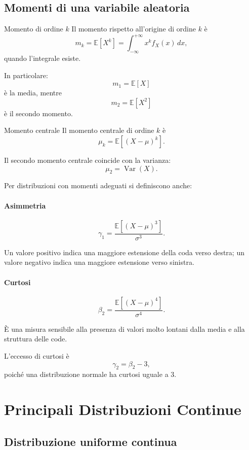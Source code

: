 \subsection{Momenti di una variabile aleatoria}

\begin{definition}{Momento di ordine $k$}
Il momento rispetto all'origine
di ordine $k$ è
\[
\boxed{
m_k=\mathbb{E}[X^k]
=
\int_{-\infty}^{+\infty}
x^k f_X(x)\,dx,
}
\]
quando l'integrale esiste.
\end{definition}

In particolare:
\[
m_1=\mathbb{E}[X]
\]
è la media, mentre
\[
m_2=\mathbb{E}[X^2]
\]
è il secondo momento.

\begin{definition}{Momento centrale}
Il momento centrale di ordine $k$ è
\[
\boxed{
\mu_k=\mathbb{E}[(X-\mu)^k].
}
\]
\end{definition}

Il secondo momento centrale coincide
con la varianza:
\[
\mu_2=\operatorname{Var}(X).
\]

Per distribuzioni con momenti adeguati
si definiscono anche:

\paragraph{Asimmetria}
\[
\gamma_1
=
\frac{\mathbb{E}[(X-\mu)^3]}{\sigma^3}.
\]

Un valore positivo indica
una maggiore estensione
della coda verso destra;
un valore negativo
indica una maggiore estensione
verso sinistra.

\paragraph{Curtosi}
\[
\beta_2
=
\frac{\mathbb{E}[(X-\mu)^4]}{\sigma^4}.
\]

È una misura sensibile
alla presenza di valori molto lontani
dalla media e alla struttura delle code.

L'eccesso di curtosi è
\[
\gamma_2=\beta_2-3,
\]
poiché una distribuzione normale
ha curtosi uguale a 3.



\section{Principali Distribuzioni Continue}

\subsection{Distribuzione uniforme continua}

